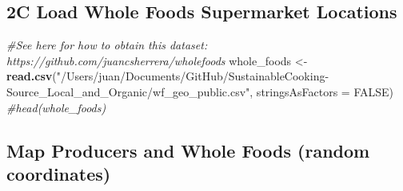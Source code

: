 \documentclass[]{article}
\newenvironment{Shaded}{\begin{snugshade}}{\end{snugshade}}
\newcommand{\KeywordTok}[1]{\textcolor[rgb]{0.13,0.29,0.53}{\textbf{#1}}}
\newcommand{\DataTypeTok}[1]{\textcolor[rgb]{0.13,0.29,0.53}{#1}}
\newcommand{\StringTok}[1]{\textcolor[rgb]{0.31,0.60,0.02}{#1}}
\newcommand{\CommentTok}[1]{\textcolor[rgb]{0.56,0.35,0.01}{\textit{#1}}}
\newcommand{\OtherTok}[1]{\textcolor[rgb]{0.56,0.35,0.01}{#1}}
\newcommand{\NormalTok}[1]{#1}
\begin{document}
\subsection{2C Load Whole Foods Supermarket
Locations}\label{c-load-whole-foods-supermarket-locations}

\begin{Shaded}
\begin{Highlighting}[]
\CommentTok{#See here for how to obtain this dataset: https://github.com/juancsherrera/wholefoods}
\NormalTok{whole_foods <-}\StringTok{ }\KeywordTok{read.csv}\NormalTok{(}\StringTok{"/Users/juan/Documents/GitHub/SustainableCooking-Source_Local_and_Organic/wf_geo_public.csv"}\NormalTok{, }\DataTypeTok{stringsAsFactors =} \OtherTok{FALSE}\NormalTok{)}
\CommentTok{#head(whole_foods)}
\end{Highlighting}
\end{Shaded}

\subsection{Map Producers and Whole Foods (random
coordinates)}\label{map-producers-and-whole-foods-random-coordinates}
\end{document}
